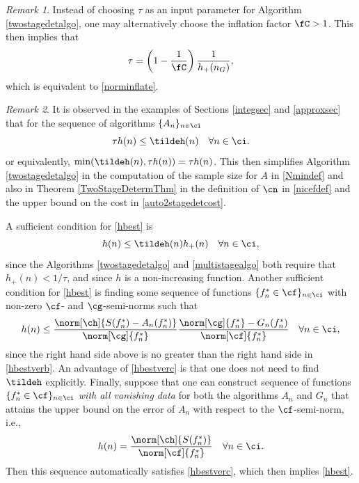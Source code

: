 \documentclass[]{elsarticle}
\theoremstyle{definition}
\theoremstyle{remark}
\newtheorem{rem}{Remark}
\begin{document}
\begin{rem} Instead of choosing $\tau$ as an input parameter for Algorithm \ref{twostagedetalgo}, one may alternatively choose the inflation factor $\fC >1$.  This then implies that 
\begin{equation} \label{taufromnC}
\tau = \left(1 - \frac{1}{\fC}\right)\frac{1}{h_{+}(n_G)},
\end{equation}
which is equivalent to \eqref{norminflate}.
\end{rem}

\begin{rem} It is observed in the examples of Sections \ref{integsec} and \ref{approxsec} that for the sequence of algorithms $\{A_n\}_{n \in \ci}$
\begin{equation} \label{hbest}
\tau h(n) \le \tildeh(n) \quad \forall n \in \ci.
\end{equation}
or equivalently, $\min(\tildeh(n),\tau h(n))=\tau h(n)$.  This then simplifies Algorithm \ref{twostagedetalgo} in the computation of the sample size for $A$ in \eqref{Nmindef} and also in Theorem \ref{TwoStageDetermThm} in the definition of $\cn$ in \eqref{nicefdef} and the upper bound on the cost in \eqref{auto2stagedetcost}. 

A sufficient condition for \eqref{hbest} is
\begin{equation} \label{hbestverb}
h(n) \le \tildeh(n) h_{+}(n) \quad \forall n \in \ci,
\end{equation}
since the Algorithms \ref{twostagedetalgo} and \ref{multistagealgo} both require that $h_{+}(n) < 1/\tau$, and since $h$ is a non-increasing function.   Another 
sufficient condition for \eqref{hbest} is finding some sequence of functions $\{f^*_n \in \cf\}_{n \in \ci}$ with non-zero $\cf$- and $\cg$-semi-norms such that 
\begin{equation} \label{hbestverc}
h(n) \le \frac{\norm[\ch]{S(f^*_n)-A_n(f_n^*)}}{\norm[\cg]{f_n^*}} \frac{\norm[\cg]{f^*_n}-G_n(f^*_n)}{\norm[\cf]{f^*_n}}   \quad \forall n \in \ci,
\end{equation}
since the right hand side above is no greater than the right hand side in \eqref{hbestverb}. An advantage of \eqref{hbestverc} is that one does not need to find $\tildeh$ explicitly. Finally, suppose that one can construct sequence of functions $\{f^*_n \in \cf\}_{n \in \ci}$ \emph{with all vanishing data} for both the algorithms $A_n$ and $G_n$ that attains the upper bound on the error of $A_n$ with respect to the $\cf$-semi-norm, i.e.,
\begin{equation} \label{hbestverd}
h(n) = \frac{\norm[\ch]{S(f^*_n)}}{\norm[\cf]{f^*_n}}   \quad \forall n \in \ci.
\end{equation}
Then this sequence automatically satisfies \eqref{hbestverc}, which then implies \eqref{hbest}.
\end{rem}
\end{document}
